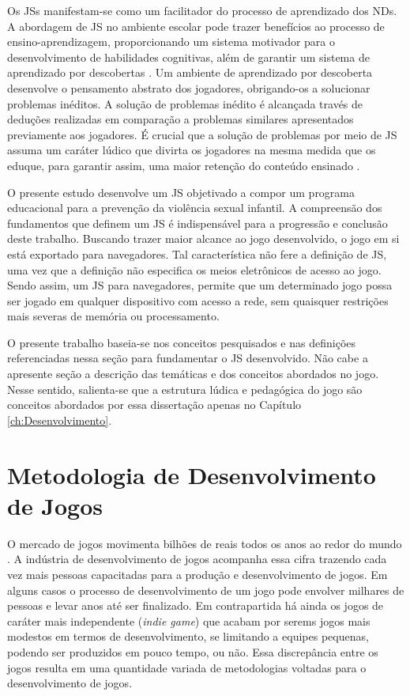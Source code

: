 Os \acp{JS} manifestam-se como um facilitador do processo de aprendizado dos \acp{ND}. A abordagem de \ac{JS} no ambiente escolar pode trazer benefícios ao processo de ensino-aprendizagem, proporcionando um sistema motivador para o desenvolvimento de habilidades cognitivas, além de garantir um sistema de aprendizado por descobertas \cite{carvalho2017move4math}. Um ambiente de aprendizado por descoberta desenvolve o pensamento abstrato dos jogadores, obrigando-os a solucionar problemas inéditos. A solução de problemas inédito é alcançada través de deduções realizadas em comparação a problemas similares apresentados previamente aos jogadores. É crucial que a solução de problemas por meio de \ac{JS} assuma um caráter lúdico que divirta os jogadores na mesma medida que os eduque, para garantir assim, uma maior retenção do conteúdo ensinado \cite{tarouco2004jogos}. 

O presente estudo desenvolve um \ac{JS} objetivado a compor um programa educacional para a prevenção da violência sexual infantil. A compreensão dos fundamentos que definem um \ac{JS} é indispensável para a progressão e conclusão deste trabalho. Buscando trazer maior alcance ao jogo desenvolvido, o jogo em si está exportado para navegadores. Tal característica não fere a definição de \ac{JS}, uma vez que a definição não especifica os meios eletrônicos de acesso ao jogo. Sendo assim, um \ac{JS} para navegadores, permite que um determinado jogo possa ser jogado em qualquer dispositivo com acesso a rede, sem quaisquer restrições mais severas de memória ou processamento. 

O presente trabalho baseia-se nos conceitos pesquisados e nas definições referenciadas nessa seção para fundamentar o \ac{JS} desenvolvido. Não cabe a apresente seção a descrição das temáticas e dos conceitos abordados no jogo. Nesse sentido, salienta-se que a estrutura lúdica e pedagógica do jogo são conceitos abordados por essa dissertação apenas no Capítulo \ref{ch:Desenvolvimento}.


\section{Metodologia de Desenvolvimento de Jogos}\label{sec:Engenharia}

O mercado de jogos movimenta bilhões de reais todos os anos ao redor do mundo \cite{fortim2020games}. A indústria de desenvolvimento de jogos acompanha essa cifra trazendo cada vez mais pessoas capacitadas para a produção e desenvolvimento de jogos. Em alguns casos o processo de desenvolvimento de um jogo pode envolver milhares de pessoas e levar anos até ser finalizado. Em contrapartida há ainda os jogos de caráter mais independente (\textit{indie game}) que acabam por serems jogos mais modestos em termos de desenvolvimento, se limitando a equipes pequenas, podendo ser produzidos em pouco tempo, ou não. Essa discrepância entre os jogos resulta em uma quantidade variada de metodologias voltadas para o desenvolvimento de jogos.

